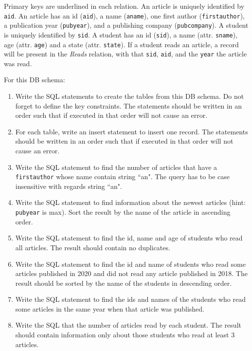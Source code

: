 \documentclass[letterpaper, 11pt]{article}
\begin{document}
Primary keys are underlined in each relation. An article is uniquely identified by \texttt{aid}. An article has an id (\texttt{aid}), a name (\texttt{aname}), one first author (\texttt{first\textunderscore author}), a publication year (\texttt{pubyear}), and a publishing company (\texttt{pubcompany}). A student is uniquely identified by \texttt{sid}. A student has an id (\texttt{sid}), a name (attr. \texttt{sname}), age (attr. \texttt{age}) and a state (attr. \texttt{state}). If a student reads an article, a record will be present in the \textit{Reads} relation, with that \texttt{sid}, \texttt{aid}, and the \texttt{year} the article was read.

For this DB schema:
\begin{enumerate}[label={\alph*}),leftmargin=*]
    \item Write the SQL statements to create the tables from this DB schema. Do not forget to define the key constraints. The statements should be written in an order such that if executed in that order will not cause an error.
    \item For each table, write an insert statement to insert one record. The statements should be written in an order such that if executed in that order will not cause an error.
    \item Write the SQL statement to find the number of articles that have a \texttt{first\textunderscore author} whose name contain string ``an". The query has to be case insensitive with regards string ``an".
    \item Write the SQL statement to find information about the newest articles (hint: \texttt{pubyear} is max). Sort the result by the name of the article in ascending order.
    \item Write the SQL statement to find the id, name and age of students who read all articles. The result should contain no duplicates.
    \item Write the SQL statement to find the id and name of students who read some articles published in 2020 and did not read any article published in 2018. The result should be sorted by the name of the students in descending order.
    \item Write the SQL statement to find the ids and names of the students who read some articles in the same year when that article was published.
    \item Write the SQL that the number of articles read by each student. The result should contain information only about those students who read at least 3 articles.

\end{enumerate}
\end{document}
